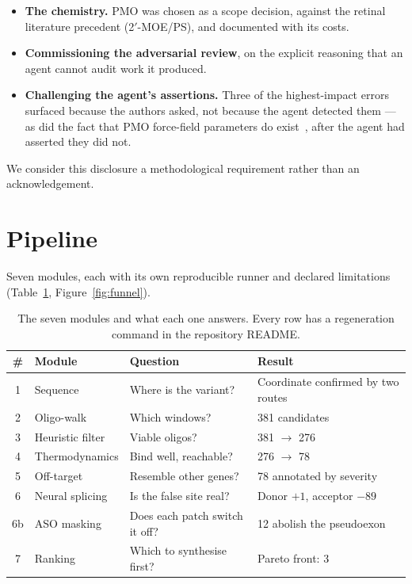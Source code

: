 \documentclass[11pt,a4paper]{article}
\begin{document}
\begin{itemize}[nosep, leftmargin=1.4em]
  \item \textbf{The chemistry.} PMO was chosen as a scope decision, against the retinal literature
        precedent (2$'$-MOE/PS), and documented with its costs.
  \item \textbf{Commissioning the adversarial review}, on the explicit reasoning that an agent
        cannot audit work it produced.
  \item \textbf{Challenging the agent's assertions.} Three of the highest-impact errors surfaced
        because the authors asked, not because the agent detected them --- as did the fact that PMO
        force-field parameters do exist~\cite{maksudov2023}, after the agent had asserted they did
        not.
\end{itemize}

We consider this disclosure a methodological requirement rather than an acknowledgement.

\section{Pipeline}
\label{sec:pipeline}

Seven modules, each with its own reproducible runner and declared limitations
(Table~\ref{tab:modules}, Figure~\ref{fig:funnel}).

\begin{table}[htbp]
\centering
\small
\begin{tabular}{@{}clll@{}}
\toprule
\textbf{\#} & \textbf{Module} & \textbf{Question} & \textbf{Result} \\
\midrule
1  & Sequence         & Where is the variant?              & Coordinate confirmed by two routes~\cite{freeman2018} \\
2  & Oligo-walk       & Which windows?                     & 381 candidates \\
3  & Heuristic filter & Viable oligos?                     & 381 $\rightarrow$ 276 \\
4  & Thermodynamics   & Bind well, reachable?              & 276 $\rightarrow$ 78 \\
5  & Off-target       & Resemble other genes?              & 78 annotated by severity \\
6  & Neural splicing  & Is the false site real?            & Donor $+1$, acceptor $-89$ \\
6b & ASO masking      & Does each patch switch it off?     & 12 abolish the pseudoexon \\
7  & Ranking          & Which to synthesise first?         & Pareto front: 3 \\
\bottomrule
\end{tabular}
\caption{The seven modules and what each one answers. Every row has a regeneration command in the
repository README.}
\label{tab:modules}
\end{table}
\end{document}
